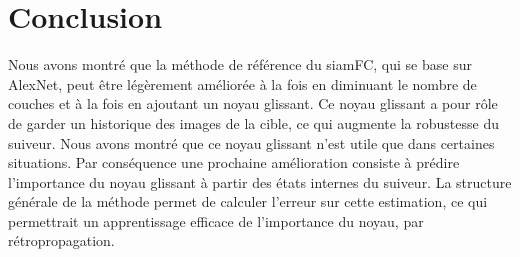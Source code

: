 \documentclass[10pt,twocolumn,letterpaper,french]{article}
\begin{document}
\section*{Conclusion}

Nous avons montré que la méthode de référence du siamFC, qui se base sur AlexNet, peut être légèrement améliorée à la fois en diminuant le nombre de couches et à la fois en ajoutant un noyau glissant. Ce noyau glissant a pour rôle de garder un historique des images de la cible, ce qui augmente la robustesse du suiveur. Nous avons montré que ce noyau glissant n'est utile que dans certaines situations. Par conséquence une prochaine amélioration consiste à prédire l'importance du noyau glissant à partir des états internes du suiveur. La structure générale de la méthode permet de calculer l'erreur sur cette estimation, ce qui permettrait un apprentissage efficace de l'importance du noyau, par rétropropagation.


{\small


}

\clearpage
\onecolumn
\end{document}
